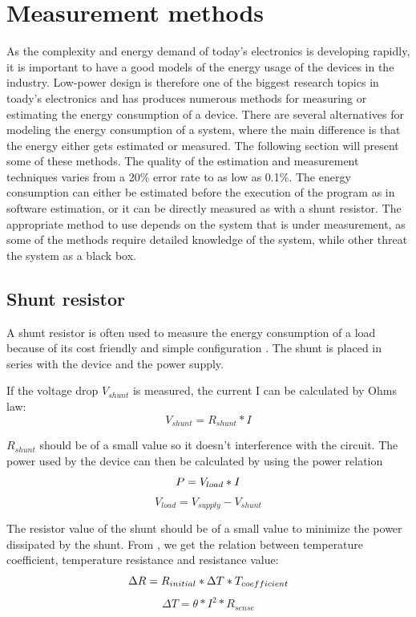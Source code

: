 \chapter{Measurement methods}
As the complexity and energy demand of today's electronics is developing rapidly, it is  important to have a good models of the energy usage of the devices in the industry. Low-power design is therefore one of the biggest research topics in toady's electronics and has produces numerous methods for measuring or estimating the energy consumption of a device. There are several alternatives for modeling the energy consumption of a system, where the main difference is that the energy either gets estimated or measured. The following section will present some of these methods. The quality of the estimation and measurement techniques varies from a 20\% error rate to as low as 0.1\%.  The energy consumption can either be estimated before the execution of the program as in software estimation, or it can be directly measured as with a shunt resistor. The appropriate method to use depends on the system that is under measurement, as some of the methods require detailed knowledge of the system, while other threat the system as a black box.
\section{Shunt resistor}
A shunt resistor is often used to measure the energy consumption of a load because of its cost friendly and simple configuration \cite{Intersil} \cite{Infineon} \cite{Vishay}. The shunt is placed in series with the device and the power supply.

If the voltage drop $V_{shunt}$ is measured, the current I can be calculated by Ohms law:\begin{equation}
V_{shunt}=R_{shunt}*I
\end{equation}

$R_{shunt}$ should be of a small value so it doesn't interference with the circuit. The power used by the device can then be calculated by using the power relation \begin{equation}
P=V_{load}*I \\
\end{equation}
\begin{equation}
V_{load}= V_{supply}-V_{shunt}
\end{equation}

 The resistor value of the shunt should be of a small value to minimize the power dissipated by the shunt. From \cite{Intersil}, we get the relation between temperature coefficient, temperature resistance and resistance value:
\begin{equation}
\Delta R= R_{initial}* \Delta T * T_{coefficient}\\
\label{rchange}
\end{equation}
\begin{equation}
 \Delta T = \theta * I^{2}*R_{sense}
\end{equation}

